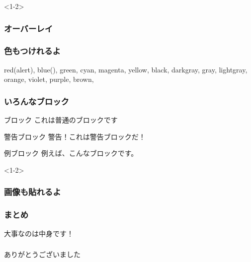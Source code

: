 \documentclass[dvipdfmx,11pt,notheorems]{beamer}
\theoremstyle{definition}
\newtheorem{theorem}{定理}
\begin{document}
\begin{frame}<1-2>\frametitle{オーバーレイ}
\end{frame}

\begin{frame}\frametitle{色もつけれるよ}
  {\color{red} red}(\alert{alert}),
  {\color{blue} blue}(),
  {\color{green} green},
  {\color{cyan} cyan},
  {\color{magenta} magenta},
  {\color{yellow} yellow},
  {\color{black} black},
  {\color{darkgray} darkgray},
  {\color{gray} gray},
  {\color{lightgray} lightgray},
  {\color{orange} orange},
  {\color{violet} violet},
  {\color{purple} purple},
  {\color{brown} brown},
\end{frame}

\begin{frame}\frametitle{いろんなブロック}
\begin{block}{ブロック}
これは普通のブロックです
\end{block}

\begin{alertblock}{警告ブロック}
警告！これは警告ブロックだ！
\end{alertblock}

\begin{exampleblock}{例ブロック}
例えば、こんなブロックです。
\end{exampleblock}
\end{frame}

\begin{frame}<1-2>\frametitle{画像も貼れるよ}
\end{frame}

\begin{frame}\frametitle{まとめ}
\LARGE{大事なのは中身です！}
\end{frame}

\begin{frame}\frametitle{}
{\Large ありがとうございました}
\end{frame}
\appendix
\end{document}
